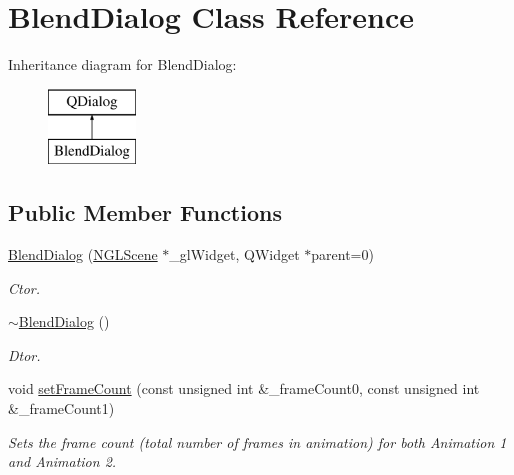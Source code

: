 \hypertarget{class_blend_dialog}{}\section{Blend\+Dialog Class Reference}
\label{class_blend_dialog}
Inheritance diagram for Blend\+Dialog\+:\begin{figure}[H]
\begin{center}
\leavevmode
\includegraphics[height=2.000000cm]{class_blend_dialog}
\end{center}
\end{figure}
\subsection*{Public Member Functions}
\begin{DoxyCompactItemize}
\item 
\hyperlink{class_blend_dialog_a32d1a81a428482470e08a274a1da20b3}{Blend\+Dialog} (\hyperlink{class_n_g_l_scene}{N\+G\+L\+Scene} $\ast$\+\_\+gl\+Widget, Q\+Widget $\ast$parent=0)\hypertarget{class_blend_dialog_a32d1a81a428482470e08a274a1da20b3}{}\label{class_blend_dialog_a32d1a81a428482470e08a274a1da20b3}

\begin{DoxyCompactList}\small\item\em Ctor. \end{DoxyCompactList}\item 
\hyperlink{class_blend_dialog_af7f85c63ce183cb9d3d1a2b7f16cc3bb}{$\sim$\+Blend\+Dialog} ()\hypertarget{class_blend_dialog_af7f85c63ce183cb9d3d1a2b7f16cc3bb}{}\label{class_blend_dialog_af7f85c63ce183cb9d3d1a2b7f16cc3bb}

\begin{DoxyCompactList}\small\item\em Dtor. \end{DoxyCompactList}\item 
void \hyperlink{class_blend_dialog_a024650fac4f60d8d9efaf7070cd053b7}{set\+Frame\+Count} (const unsigned int \&\+\_\+frame\+Count0, const unsigned int \&\+\_\+frame\+Count1)
\begin{DoxyCompactList}\small\item\em Sets the frame count (total number of frames in animation) for both Animation 1 and Animation 2. \end{DoxyCompactList}\end{DoxyCompactItemize}
